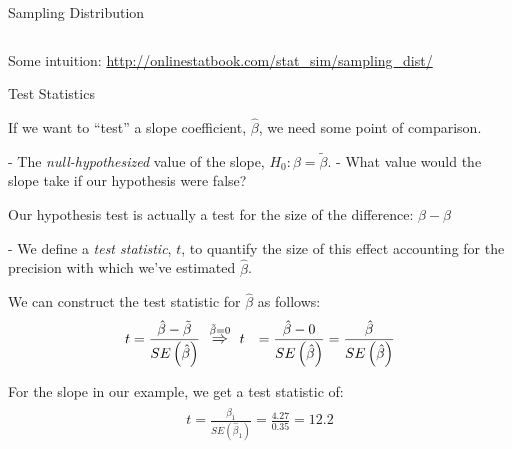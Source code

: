 \documentclass[10pt]{beamer}\usepackage[]{graphicx}\usepackage[]{color}
\newenvironment{knitrout}{}{} %
\begin{document}
\begin{frame}[shrink = 5]{Sampling Distribution}
\begin{columns}
\begin{column}{0.5\textwidth}
\begin{knitrout}
{}


\end{knitrout}

\end{column}
\end{columns}

Some intuition: \url{http://onlinestatbook.com/stat_sim/sampling_dist/}

\end{frame}

\watermarkon %

\begin{frame}{Test Statistics}
 
  If we want to ``test'' a slope coefficient, $\hat{\beta}$, we need
  some point of comparison.
  
  - The \emph{null-hypothesized} value of the slope, $H_0: \beta = \tilde{\beta}$.
  - What value would the slope take if our hypothesis were false?
  
  Our hypothesis test is actually a test for the size of the difference:
  $\hat{\beta} - \beta$
  
  - We define a \emph{test statistic}, $t$, to quantify the size of this effect
  accounting for the precision with which we've estimated $\hat{\beta}$.
  
  We can construct the test statistic for $\hat{\beta}$ as follows:
  \begin{align*}
    t &= \frac{\hat{\beta} - \tilde{\beta}}{SE\left(\hat{\beta}\right)} 
    ~~\overset{\tilde{\beta} = 0}{\mathlarger{\Rightarrow}}~~
    t &= \frac{\hat{\beta} - 0}{SE\left(\hat{\beta}\right)} = 
    \frac{\hat{\beta}}{SE\left(\hat{\beta}\right)}
  \end{align*}
  


For the slope in our example, we get a test statistic of:
\begin{align*}
  t = \frac{\hat{\beta}_1}{SE\left(\hat{\beta}_1\right)} = 
    \frac{4.27}{0.35} = 12.2
\end{align*}

\end{frame}

\watermarkoff %
\end{document}
